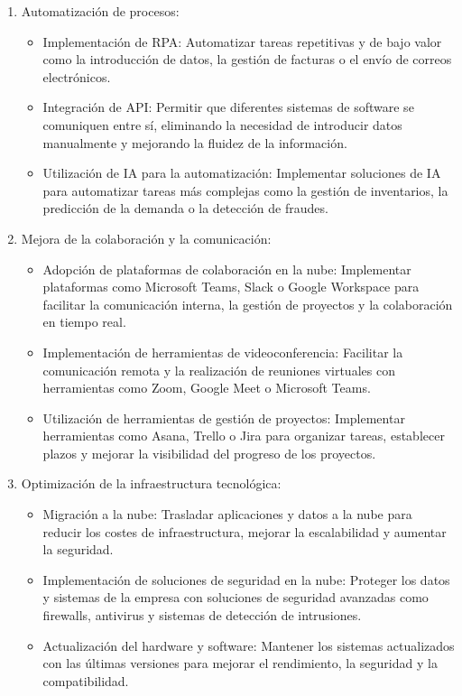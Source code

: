 \documentclass{article}
\begin{document}
\begin{enumerate}
  \item Automatización de procesos:
  \begin{itemize}
    \item Implementación de RPA: Automatizar tareas repetitivas y de bajo valor como la introducción de datos, la gestión de facturas o el envío de correos electrónicos.
    \item Integración de API: Permitir que diferentes sistemas de software se comuniquen entre sí, eliminando la necesidad de introducir datos manualmente y mejorando la fluidez de la información.
    \item Utilización de IA para la automatización: Implementar soluciones de IA para automatizar tareas más complejas como la gestión de inventarios, la predicción de la demanda o la detección de fraudes.
  \end{itemize}
  \item Mejora de la colaboración y la comunicación:
  \begin{itemize}
    \item Adopción de plataformas de colaboración en la nube: Implementar plataformas como Microsoft Teams, Slack o Google Workspace para facilitar la comunicación interna, la gestión de proyectos y la colaboración en tiempo real.
    \item Implementación de herramientas de videoconferencia: Facilitar la comunicación remota y la realización de reuniones virtuales con herramientas como Zoom, Google Meet o Microsoft Teams.
    \item Utilización de herramientas de gestión de proyectos: Implementar herramientas como Asana, Trello o Jira para organizar tareas, establecer plazos y mejorar la visibilidad del progreso de los proyectos.
  \end{itemize}
  \item Optimización de la infraestructura tecnológica:
  \begin{itemize}
    \item Migración a la nube: Trasladar aplicaciones y datos a la nube para reducir los costes de infraestructura, mejorar la escalabilidad y aumentar la seguridad.
    \item Implementación de soluciones de seguridad en la nube: Proteger los datos y sistemas de la empresa con soluciones de seguridad avanzadas como firewalls, antivirus y sistemas de detección de intrusiones.
    \item Actualización del hardware y software: Mantener los sistemas actualizados con las últimas versiones para mejorar el rendimiento, la seguridad y la compatibilidad.

\end{itemize}
\end{enumerate}
\end{document}
